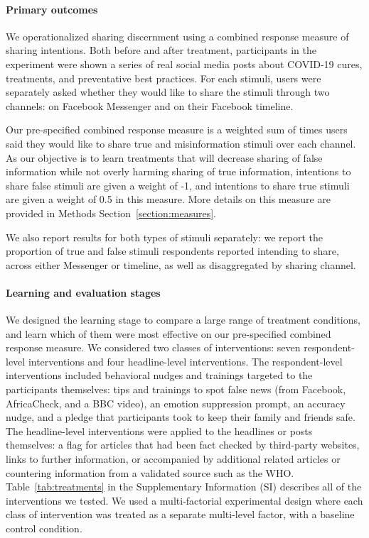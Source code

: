 \documentclass[letterpaper, 12pt, parskip=full,DIV=10]{scrartcl}
\begin{document}
\paragraph{Primary outcomes}
We operationalized sharing discernment using a combined response measure of sharing intentions. Both before and after treatment, participants in the experiment were shown a series of real social media posts about COVID-19 cures, treatments, and preventative best practices. For each stimuli, users were separately asked whether they would like to share the stimuli through two channels: on Facebook Messenger and on their Facebook timeline. 

Our pre-specified combined response measure is a weighted sum of times users said they would like to share true and misinformation stimuli over each channel. As our objective is to learn treatments that will decrease sharing of false information while not overly harming sharing of true information, intentions to share false stimuli are given a weight of -1, and intentions to share true stimuli are given a weight of 0.5 in this measure. More details on this measure are provided in Methods Section~\ref{section:measures}. 

We also report results for both types of stimuli separately: we report the proportion of true and false stimuli respondents reported intending to share, across either Messenger or timeline, as well as disaggregated by sharing channel.  


\paragraph{Learning and evaluation stages}
We designed the learning stage to compare a large range of treatment conditions, and learn which of them were most effective on our pre-specified combined response measure.  We considered two classes of interventions: seven respondent-level interventions and four headline-level interventions. The respondent-level interventions included behavioral nudges and trainings targeted to the participants themselves: tips and trainings to spot false news (from Facebook, AfricaCheck, and a BBC video), an emotion suppression prompt, an accuracy nudge, and a pledge that participants took to keep their family and friends safe. The headline-level interventions were applied to the headlines or posts themselves: a flag for articles that had been fact checked by third-party websites, links to further information, or accompanied by additional related articles or countering information from a validated source such as the WHO. Table~\ref{tab:treatments} in the Supplementary Information (SI) describes all of the interventions we tested. %
We used a multi-factorial experimental design where each class of intervention was treated as a separate multi-level factor, with a baseline control condition. 
\end{document}
